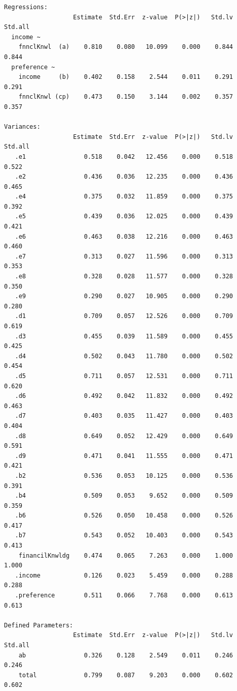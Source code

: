 \documentclass[
  super,
  preprint,
  3p]{elsarticle}
\begin{document}
\begin{verbatim}
Regressions:
                   Estimate  Std.Err  z-value  P(>|z|)   Std.lv  Std.all
  income ~                                                              
    fnnclKnwl  (a)    0.810    0.080   10.099    0.000    0.844    0.844
  preference ~                                                          
    income     (b)    0.402    0.158    2.544    0.011    0.291    0.291
    fnnclKnwl (cp)    0.473    0.150    3.144    0.002    0.357    0.357

Variances:
                   Estimate  Std.Err  z-value  P(>|z|)   Std.lv  Std.all
   .e1                0.518    0.042   12.456    0.000    0.518    0.522
   .e2                0.436    0.036   12.235    0.000    0.436    0.465
   .e4                0.375    0.032   11.859    0.000    0.375    0.392
   .e5                0.439    0.036   12.025    0.000    0.439    0.421
   .e6                0.463    0.038   12.216    0.000    0.463    0.460
   .e7                0.313    0.027   11.596    0.000    0.313    0.353
   .e8                0.328    0.028   11.577    0.000    0.328    0.350
   .e9                0.290    0.027   10.905    0.000    0.290    0.280
   .d1                0.709    0.057   12.526    0.000    0.709    0.619
   .d3                0.455    0.039   11.589    0.000    0.455    0.425
   .d4                0.502    0.043   11.780    0.000    0.502    0.454
   .d5                0.711    0.057   12.531    0.000    0.711    0.620
   .d6                0.492    0.042   11.832    0.000    0.492    0.463
   .d7                0.403    0.035   11.427    0.000    0.403    0.404
   .d8                0.649    0.052   12.429    0.000    0.649    0.591
   .d9                0.471    0.041   11.555    0.000    0.471    0.421
   .b2                0.536    0.053   10.125    0.000    0.536    0.391
   .b4                0.509    0.053    9.652    0.000    0.509    0.359
   .b6                0.526    0.050   10.458    0.000    0.526    0.417
   .b7                0.543    0.052   10.403    0.000    0.543    0.413
    financilKnwldg    0.474    0.065    7.263    0.000    1.000    1.000
   .income            0.126    0.023    5.459    0.000    0.288    0.288
   .preference        0.511    0.066    7.768    0.000    0.613    0.613

Defined Parameters:
                   Estimate  Std.Err  z-value  P(>|z|)   Std.lv  Std.all
    ab                0.326    0.128    2.549    0.011    0.246    0.246
    total             0.799    0.087    9.203    0.000    0.602    0.602
\end{verbatim}
\end{document}
